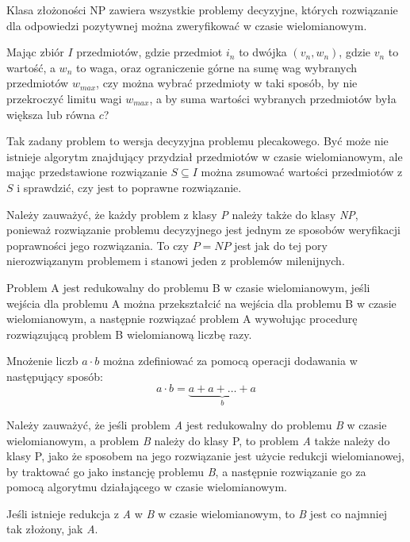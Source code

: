 \begin{definition}
    Klasa złożoności NP zawiera wszystkie problemy decyzyjne, których rozwiązanie dla odpowiedzi pozytywnej
można zweryfikować w czasie wielomianowym.
\end{definition}
\begin{example}
    Mając zbiór $I$ przedmiotów, gdzie przedmiot $i_n$ to dwójka $(v_n, w_n)$, gdzie $v_n$ to wartość,
a $w_n$ to waga, oraz ograniczenie górne na sumę wag wybranych przedmiotów $w_{max}$, czy można
wybrać przedmioty w taki sposób, by nie przekroczyć limitu wagi $w_{max}$, a by suma wartości
wybranych przedmiotów była większa lub równa $c$?

    Tak zadany problem to wersja decyzyjna problemu plecakowego. Być może nie istnieje algorytm znajdujący
przydział przedmiotów w czasie wielomianowym, ale mając przedstawione rozwiązanie $S \subseteq I$
można zsumować wartości przedmiotów z $S$ i sprawdzić, czy jest to poprawne rozwiązanie.
\end{example}

    Należy zauważyć, że każdy problem z klasy \textit{P} należy także do klasy \textit{NP}, ponieważ
rozwiązanie problemu decyzyjnego jest jednym ze sposobów weryfikacji poprawności jego rozwiązania.
To czy $P = NP$ jest jak do tej pory nierozwiązanym problemem i stanowi jeden z problemów milenijnych.


\begin{definition}
    Problem A jest redukowalny do problemu B w czasie wielomianowym, jeśli wejścia dla problemu A
można przekształcić na wejścia dla problemu B w czasie wielomianowym, a następnie rozwiązać problem A
wywołując procedurę rozwiązującą problem B wielomianową liczbę razy.
\end{definition}
\begin{example}
    Mnożenie liczb $a \cdot b$ można zdefiniować za pomocą operacji dodawania w następujący sposób:
$$a \cdot b = \underbrace{a + a + \ldots + a}_{b}$$
\end{example}
    Należy zauważyć, że jeśli problem \textit{A} jest redukowalny do problemu \textit{B} w czasie wielomianowym,
a problem \textit{B} należy do klasy P, to problem \textit{A} także należy do klasy P, jako że
sposobem na jego rozwiązanie jest użycie redukcji wielomianowej, by traktować go jako instancję problemu \textit{B},
a następnie rozwiązanie go za pomocą algorytmu działającego w czasie wielomianowym.
\begin{corollary}
    Jeśli istnieje redukcja z \textit{A} w \textit{B} w czasie wielomianowym, to \textit{B} jest
co najmniej tak złożony, jak \textit{A}.
\end{corollary}


